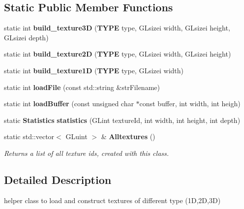 \subsection*{Static Public Member Functions}
\begin{DoxyCompactItemize}
\item 
static int {\bfseries build\-\_\-texture3\-D} ({\bf T\-Y\-P\-E} type, G\-Lsizei width, G\-Lsizei height, G\-Lsizei depth)\label{classsfs__visualizer_1_1TextureFactory_a7c91e66c62cd2d3038b1b1b148ec08c5}

\item 
static int {\bfseries build\-\_\-texture2\-D} ({\bf T\-Y\-P\-E} type, G\-Lsizei width, G\-Lsizei height)\label{classsfs__visualizer_1_1TextureFactory_a79c750edbf9dfd2996c41a5955d7f7af}

\item 
static int {\bfseries build\-\_\-texture1\-D} ({\bf T\-Y\-P\-E} type, G\-Lsizei width)\label{classsfs__visualizer_1_1TextureFactory_a7442cfd8cfc0bf3015fcb3da2e7c3c44}

\item 
static int {\bfseries load\-File} (const std\-::string \&str\-Filename)\label{classsfs__visualizer_1_1TextureFactory_a00e4626f5f608e8fa6d7d48a5287cf79}

\item 
static int {\bfseries load\-Buffer} (const unsigned char $\ast$const buffer, int width, int heigh)\label{classsfs__visualizer_1_1TextureFactory_a6ca8e90ea418b60e29d5f638e4186bff}

\item 
static {\bf Statistics} {\bfseries statistics} (G\-Lint texture\-Id, int width, int height, int depth)\label{classsfs__visualizer_1_1TextureFactory_a76b5bc916ba894520e363ffb2d87c848}

\item 
static std\-::vector$<$ G\-Luint $>$ \& {\bf Alltextures} ()
\begin{DoxyCompactList}\small\item\em Returns a list of all texture ids, created with this class. \end{DoxyCompactList}\end{DoxyCompactItemize}


\subsection{Detailed Description}
helper class to load and construct textures of different type (1\-D,2\-D,3\-D) 

